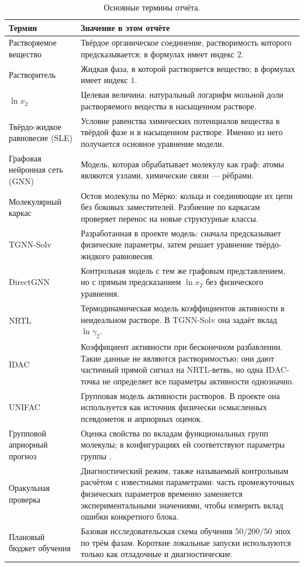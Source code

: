 \documentclass[11pt]{article}
\DeclareRobustCommand{\code}[1]{\texttt{\detokenize{#1}}}
\theoremstyle{definition}
\begin{document}
\begin{table}[H]
\centering
\caption{Основные термины отчёта.}
\label{tab:glossary}
\begin{tabularx}{\textwidth}{P{0.23\textwidth}Y}
\toprule
Термин & Значение в этом отчёте \\
\midrule
Растворяемое вещество & Твёрдое органическое соединение, растворимость которого предсказывается; в формулах имеет индекс $2$. \\
Растворитель & Жидкая фаза, в которой растворяется вещество; в формулах имеет индекс $1$. \\
$\ln x_2$ & Целевая величина: натуральный логарифм мольной доли растворяемого вещества в насыщенном растворе. \\
Твёрдо-жидкое равновесие (SLE) & Условие равенства химических потенциалов вещества в твёрдой фазе и в насыщенном растворе. Именно из него получается основное уравнение модели. \\
Графовая нейронная сеть (GNN) & Модель, которая обрабатывает молекулу как граф: атомы являются узлами, химические связи --- рёбрами. \\
Молекулярный каркас & Остов молекулы по Мёрко: кольца и соединяющие их цепи без боковых заместителей. Разбиение по каркасам проверяет перенос на новые структурные классы. \\
TGNN-Solv & Разработанная в проекте модель: сначала предсказывает физические параметры, затем решает уравнение твёрдо-жидкого равновесия. \\
DirectGNN & Контрольная модель с тем же графовым представлением, но с прямым предсказанием $\ln x_2$ без физического уравнения. \\
NRTL & Термодинамическая модель коэффициентов активности в неидеальном растворе. В TGNN-Solv она задаёт вклад $\ln\gamma_2$. \\
IDAC & Коэффициент активности при бесконечном разбавлении. Такие данные не являются растворимостью; они дают частичный прямой сигнал на NRTL-ветвь, но одна IDAC-точка не определяет все параметры активности однозначно. \\
UNIFAC & Групповая модель активности растворов. В проекте она используется как источник физически осмысленных псевдометок и априорных оценок. \\
Групповой априорный прогноз & Оценка свойства по вкладам функциональных групп молекулы; в конфигурациях ей соответствуют параметры группы \code{use\_gc\_priors}. \\
Оракульная проверка & Диагностический режим, также называемый контрольным расчётом с известными параметрами: часть промежуточных физических параметров временно заменяется экспериментальными значениями, чтобы измерить вклад ошибки конкретного блока. \\
Плановый бюджет обучения & Базовая исследовательская схема обучения $50/200/50$ эпох по трём фазам. Короткие локальные запуски используются только как отладочные и диагностические. \\
\bottomrule
\end{tabularx}
\end{table}
\end{document}
